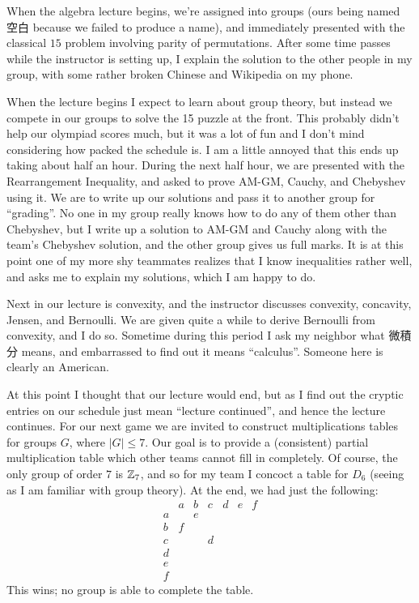 \documentclass[11pt]{scrreprt}
\begin{document}
When the algebra lecture begins,
we're assigned into groups (ours being named 空白 because we failed to produce a name),
and immediately presented with the classical $15$ problem involving parity of permutations.
After some time passes while the instructor is setting up,
I explain the solution to the other people in my group,
with some rather broken Chinese and Wikipedia on my phone.

When the lecture begins I expect to learn about group theory,
but instead we compete in our groups to solve the 15 puzzle at the front.
This probably didn't help our olympiad scores much,
but it was a lot of fun and I don't mind considering how packed the schedule is.
I am a little annoyed that this ends up taking about half an hour.
During the next half hour, we are presented with the Rearrangement Inequality, and asked to prove AM-GM,
Cauchy, and Chebyshev using it. We are to write up our solutions and pass it to another group for ``grading''.
No one in my group really knows how to do any of them other than Chebyshev,
but I write up a solution to AM-GM and Cauchy along with the team's Chebyshev solution,
and the other group gives us full marks.
It is at this point one of my more shy teammates realizes that I know inequalities rather well,
and asks me to explain my solutions, which I am happy to do.

Next in our lecture is convexity, and the instructor discusses convexity, concavity, Jensen, and Bernoulli.
We are given quite a while to derive Bernoulli from convexity, and I do so.
Sometime during this period I ask my neighbor what 微積分 means,
and embarrassed to find out it means ``calculus''. Someone here is clearly an American.

At this point I thought that our lecture would end,
but as I find out the cryptic entries on our schedule just mean ``lecture continued'',
and hence the lecture continues.
For our next game we are invited to construct multiplications tables for groups $G$,
where $\left\lvert G \right\rvert \le 7$.
Our goal is to provide a (consistent) partial multiplication table which other
teams cannot fill in completely.
Of course, the only group of order $7$ is $\mathbb Z_7$,
and so for my team I concoct a table for $D_6$ (seeing as I am familiar with group theory).
At the end, we had just the following:
\[
  \begin{array}{r|cccccc}
    & a&b&c&d&e&f \\ \hline
    a& &e&&&& \\
    b& f&&&&& \\
    c& &&d&&& \\
    d& &&&&& \\
    e& &&&&& \\
    f& &&&&&
  \end{array}
\]
This wins; no group is able to complete the table.
\end{document}
